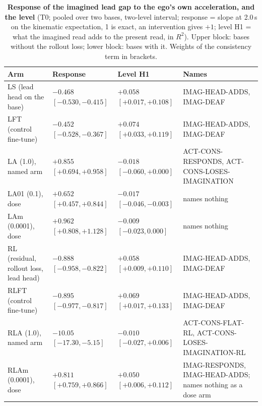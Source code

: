 \documentclass[10pt,twocolumn]{article}
\theoremstyle{remark}
\newcommand{\tier}[1]{\textsc{\small #1}}
\begin{document}
\begin{table}[!tp]
\centering
\caption{\textbf{Response of the imagined lead gap to the ego's own acceleration, and the level} (\tier{T0}; pooled over two bases, two-level interval; response = slope at 2.0\,s on the kinematic expectation, 1 is exact, an intervention gives $+1$; level H1 = what the imagined read adds to the present read, in $R^2$). Upper block: bases without the rollout loss; lower block: bases with it. Weights of the consistency term in brackets.}
\label{tab:imag}
\scriptsize
\begin{tabularx}{\textwidth}{@{}>{\raggedright\arraybackslash}p{40mm}>{\raggedright\arraybackslash}X>{\raggedright\arraybackslash}X>{\raggedright\arraybackslash}X@{}}
\toprule
Arm & Response & Level H1 & Names \\
\midrule
LS (lead head on the base) & $-0.468$ $[-0.530,-0.415]$ & $+0.058$ $[+0.017,+0.108]$ & IMAG-HEAD-ADDS, IMAG-DEAF \\
LFT (control fine-tune) & $-0.452$ $[-0.528,-0.367]$ & $+0.074$ $[+0.033,+0.119]$ & IMAG-HEAD-ADDS, IMAG-DEAF \\
LA (1.0), named arm & $+0.855$ $[+0.694,+0.958]$ & $-0.018$ $[-0.060,+0.000]$ & ACT-CONS-RESPONDS, ACT-CONS-LOSES-IMAGINATION \\
LA01 (0.1), dose & $+0.652$ $[+0.457,+0.844]$ & $-0.017$ $[-0.046,-0.003]$ & names nothing \\
LAm (0.0001), dose & $+0.962$ $[+0.808,+1.128]$ & $-0.009$ $[-0.023,0.000]$ & names nothing \\
\midrule
RL (residual, rollout loss, lead head) & $-0.888$ $[-0.958,-0.822]$ & $+0.058$ $[+0.009,+0.110]$ & IMAG-HEAD-ADDS, IMAG-DEAF \\
RLFT (control fine-tune) & $-0.895$ $[-0.977,-0.817]$ & $+0.069$ $[+0.017,+0.133]$ & IMAG-HEAD-ADDS, IMAG-DEAF \\
RLA (1.0), named arm & $-10.05$ $[-17.30,-5.15]$ & $-0.010$ $[-0.027,+0.006]$ & ACT-CONS-FLAT-RL, ACT-CONS-LOSES-IMAGINATION-RL \\
RLAm (0.0001), dose & $+0.811$ $[+0.759,+0.866]$ & $+0.050$ $[+0.006,+0.112]$ & IMAG-RESPONDS, IMAG-HEAD-ADDS; names nothing as a dose arm \\
\bottomrule
\end{tabularx}
\end{table}
\end{document}
